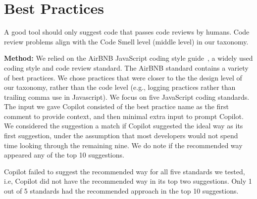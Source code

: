 \section{Best Practices}
\label{bp}
A good \AISE{} tool should only suggest code that passes code reviews by humans. Code review problems align with the Code Smell level (middle level) in our taxonomy. 


\noindent\textbf{Method:} We relied on the AirBNB JavaScript coding style guide~\cite{airbnb_code}, a widely used coding style and code review standard. 
The AirBNB standard contains a variety of best practices. 
We chose practices that were closer to the the design level of our taxonomy, rather than the code level (e.g., logging practices rather than trailing comma use in Javascript). 
We focus on five JavaScript coding standards. %
The input we gave Copilot consisted of the best practice name as the first comment to provide context, and then minimal extra input to prompt Copilot. 
We considered the suggestion a match if Copilot suggested the ideal way as its first suggestion, under the assumption that most developers would not spend time looking through the remaining nine. We do note if the recommended way appeared any of the top 10 suggestions. 

Copilot failed to suggest the recommended way for all five standards we tested, i.e, Copilot did not have the recommended way in its top two suggestions. Only 1 out of 5 standards had the recommended approach in the top 10 suggestions. 

